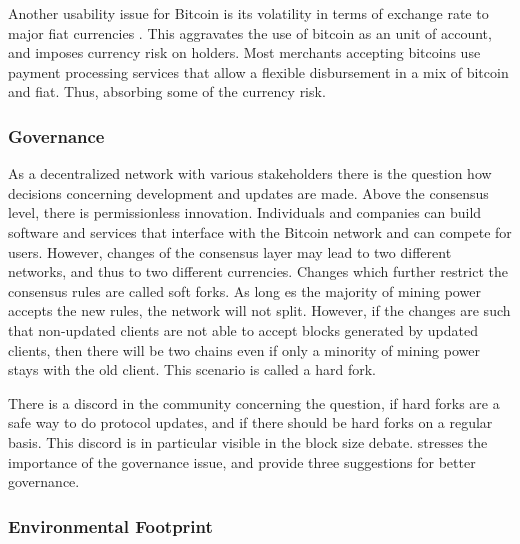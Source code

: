 Another usability issue for Bitcoin is its volatility in terms of exchange rate to major fiat currencies \parencite{Luther2014,Sapuric2014}. This aggravates the use of bitcoin as an unit of account, and imposes currency risk on holders. Most merchants accepting bitcoins use payment processing services that allow a flexible disbursement in a mix of bitcoin and fiat. Thus, absorbing some of the currency risk.





\subsubsection{Governance}

As a decentralized network with various stakeholders there is the question how decisions concerning development and updates are made. Above the consensus level, there is permissionless innovation. Individuals and companies can build software and services that interface with the Bitcoin network and can compete for users. However, changes of the consensus layer may lead to two different networks, and thus to two different currencies. Changes which further restrict the consensus rules are called soft forks. As long es the majority of mining power accepts the new rules, the network will not split. However, if the changes are such that non-updated clients are not able to accept blocks generated by updated clients, then there will be two chains even if only a minority of mining power stays with the old client. This scenario is called a hard fork. 

There is a discord in the community concerning the question, if hard forks are a safe way to do protocol updates, and if there should be hard forks on a regular basis. This discord is in particular visible in the block size debate. \cite{narayanan2015b} stresses the importance of the governance issue, and provide three suggestions for better governance.

\subsubsection{Environmental Footprint}

